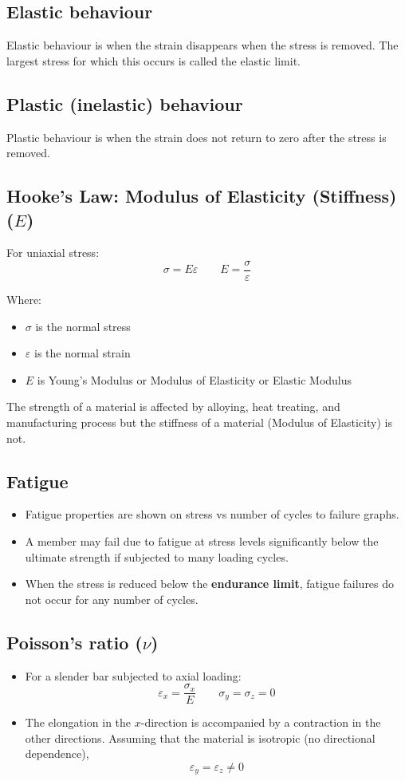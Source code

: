 \documentclass[11pt]{article}
\begin{document}
\subsection{Elastic behaviour}
\label{sec:org813bb74}
Elastic behaviour is when the strain disappears when the stress is removed. The largest stress for which this occurs is called the elastic limit.
\subsection{Plastic (inelastic) behaviour}
\label{sec:orgb3d69c3}
Plastic behaviour is when the strain does not return to zero after the stress is removed.
\subsection{Hooke's Law: Modulus of Elasticity (Stiffness) (\(E\))}
\label{sec:org70f2894}
For uniaxial stress:
\[\sigma = E \varepsilon \qquad E = \frac{\sigma}{\varepsilon}\]

Where:
\begin{itemize}
\item \(\sigma\) is the normal stress
\item \(\varepsilon\) is the normal strain
\item \(E\) is Young's Modulus or Modulus of Elasticity or Elastic Modulus
\end{itemize}

The strength of a material is affected by alloying, heat treating, and manufacturing process but the stiffness of a material (Modulus of Elasticity) is not.
\subsection{Fatigue}
\label{sec:orgba77480}
\begin{itemize}
\item Fatigue properties are shown on stress vs number of cycles to failure graphs.
\item A member may fail due to fatigue at stress levels significantly below the ultimate strength if subjected to many loading cycles.
\item When the stress is reduced below the \textbf{endurance limit}, fatigue failures do not occur for any number of cycles.
\end{itemize}

\newpage
\subsection{Poisson's ratio (\(\nu\))}
\label{sec:orgfe98346}
\begin{itemize}
\item For a slender bar subjected to axial loading:
\[\varepsilon_x = \frac{\sigma_x}{E} \qquad \sigma_y = \sigma_z = 0\]

\item The elongation in the \(x\)-direction is accompanied by a contraction in the other directions. Assuming that the material is isotropic (no directional dependence),
\[\varepsilon_y = \varepsilon_z \ne 0\]
\end{itemize}
\end{document}
